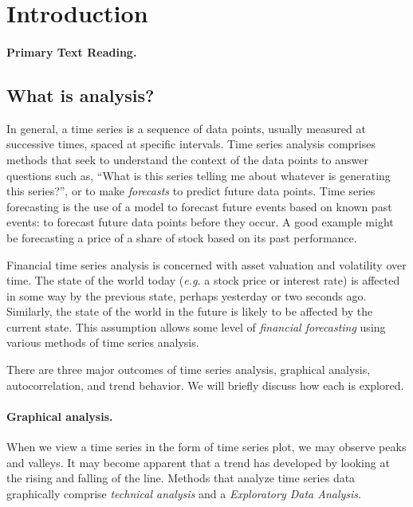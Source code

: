 \section{Introduction}
\paragraph{Primary Text Reading.} 
\subsection{What is \fts{} analysis?}
In general, a time series is a sequence of data points, usually measured at successive times, spaced at specific intervals. Time series analysis comprises methods that seek to understand the context of the data points to answer questions such as, ``What is this series telling me about whatever is generating this series?'', or to make \emph{forecasts} to predict future data points.
\marginpar{\begin{small}\begin{flushleft}\textcolor{blue}{Much of time series analysis is predicting future outcomes.}\end{flushleft}\end{small}}
Time series forecasting is the use of a model to forecast future events based on known past events: to forecast future data points before they occur. A good example might be forecasting a price of a share of stock based on its past performance.

Financial time series analysis is concerned with asset valuation and volatility over time. The state of the world today (\textit{e.g.} a stock price or interest rate) is affected in some way by the previous state, perhaps yesterday or two seconds ago. Similarly, the state of the world in the future is likely to be affected by the current state. This assumption allows some level of \emph{financial forecasting} using various methods of time series analysis.

There are three major outcomes of time series analysis, graphical analysis, autocorrelation, and trend behavior. We will briefly discuss how each is explored.

\paragraph{Graphical analysis.} When we view a time series in the form of time series plot, we may observe peaks and valleys. It may become apparent that a trend has developed by looking at the rising and falling of the line. Methods that analyze time series data graphically comprise \emph{technical analysis} and a \emph{Exploratory Data Analysis}.


